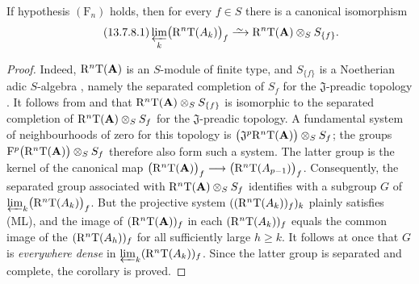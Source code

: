 \begin{corollary}[13.7.8]
\label{0.13.7.8}
If hypothesis $(\mathrm{F}_n)$ holds, then for every $f\in S$ there
is a canonical isomorphism
\begin{equation}
\label{0.13.7.8.1}
\tag{13.7.8.1}
  \varprojlim_k\bigl(\RR^n\mathrm{T}(A_k)\bigr)_f
  \isoto
  \RR^n\mathrm{T}(\bb{A})\otimes_S S_{\{f\}}.
\end{equation}
\end{corollary}

\begin{proof}
Indeed, $\mathrm{R}^n\mathrm{T}(\mathbf{A})$ is an $S$-module of finite type,
and $S_{\{f\}}$ is a Noetherian adic $S$-algebra
, namely the separated
completion of $S_f$ for the $\mathfrak{J}$-preadic topology
.
It follows from  and
 that $\mathrm{R}^n\mathrm{T}(\mathbf{A})\otimes_S S_{\{f\}}$
is isomorphic to the separated completion of
$\mathrm{R}^n\mathrm{T}(\mathbf{A})\otimes_S S_f$ for the
$\mathfrak{J}$-preadic topology.
A fundamental system of neighbourhoods of zero for this topology
is $\bigl(
\mathfrak{J}^p\mathrm{R}^n\mathrm{T}(\mathbf{A})
\bigr)\otimes_S S_f$;
the groups $\mathrm{F}^p\bigl(\mathrm{R}^n\mathrm{T}(\mathbf{A})\bigr)
\otimes_S S_f$
therefore also form such a system.
The latter group is the kernel of the canonical map $\bigl(\mathrm{R}^n\mathrm{T}(\mathbf{A})\bigr)_f
\longrightarrow
\bigl(\mathrm{R}^n\mathrm{T}(A_{p-1})\bigr)_f$.
Consequently, the separated group associated with
$\mathrm{R}^n\mathrm{T}(\mathbf{A})\otimes_S S_f$ identifies with a subgroup
$G$ of $\varprojlim_k\bigl(\mathrm{R}^n\mathrm{T}(A_k)\bigr)_f$.
But the projective system
$((\mathrm{R}^n\mathrm{T}(A_k))_f)_k$ plainly satisfies {\rm(ML)}, and the
image of $(\mathrm{R}^n\mathrm{T}(\mathbf{A}))_f$ in each
$(\mathrm{R}^n\mathrm{T}(A_k))_f$ equals the common image of the
$(\mathrm{R}^n\mathrm{T}(A_h))_f$ for all sufficiently large $h\geq k$.
It follows at once that $G$ is \emph{everywhere dense} in
$\varprojlim_k(\mathrm{R}^n\mathrm{T}(A_k))_f$.
Since the latter group is separated and complete, the corollary is
proved.
\end{proof}
